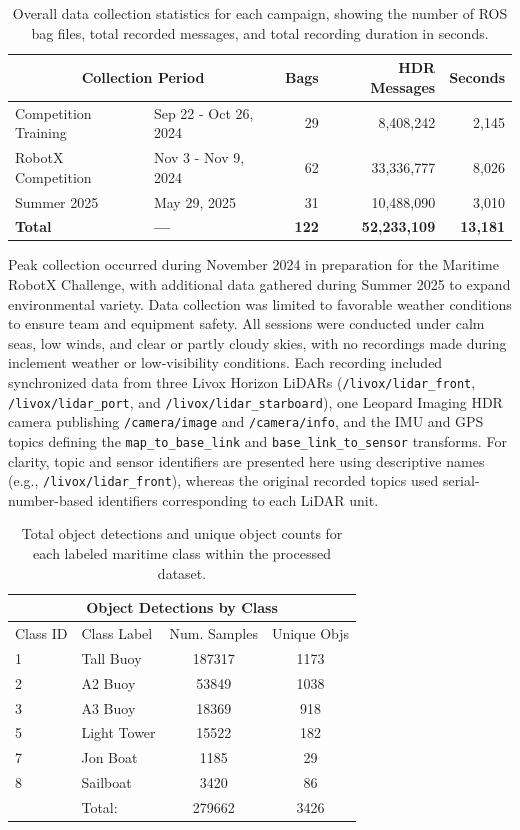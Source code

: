 \documentclass[../main.tex]{subfiles}
\begin{document}
\begin{table}[htbp]
\centering
\begin{tabular}{llrrr}
\hline
\multicolumn{2}{c}{Collection Period} & Bags & HDR Messages & Seconds \\
\hline
\hline
Competition Training & Sep 22 - Oct 26, 2024 & 29 & 8,408,242 & 2,145 \\
RobotX Competition & Nov 3 - Nov 9, 2024 & 62 & 33,336,777 & 8,026 \\
Summer 2025  & May 29, 2025 & 31 & 10,488,090 & 3,010 \\
\hline
\textbf{Total} & \textbf{---} & \textbf{122} & \textbf{52,233,109} & \textbf{13,181} \\
\hline
\end{tabular}
\caption{Overall data collection statistics for each campaign, showing the number of ROS bag files, total recorded messages, and total recording duration in seconds.}
\label{tab:rosbag_stats}
\end{table}

Peak collection occurred during November 2024 in preparation for the Maritime RobotX Challenge, with additional data gathered during Summer 2025 to expand environmental variety.  
Data collection was limited to favorable weather conditions to ensure team and equipment safety. 
All sessions were conducted under calm seas, low winds, and clear or partly cloudy skies, with no recordings made during inclement weather or low-visibility conditions.
Each recording included synchronized data from three Livox Horizon LiDARs  (\texttt{/livox/lidar\_front}, \texttt{/livox/lidar\_port}, and  \texttt{/livox/lidar\_starboard}), one Leopard Imaging HDR camera publishing  \texttt{/camera/image} and \texttt{/camera/info}, and the IMU and GPS topics defining the  \texttt{map\_to\_base\_link} and \texttt{base\_link\_to\_sensor} transforms.
For clarity, topic and sensor identifiers are presented here using descriptive names (e.g., \texttt{/livox/lidar\_front}), whereas the original recorded topics used serial-number-based identifiers corresponding to each LiDAR unit.


\begin{table}[ht]
\centering
\begin{tabular}{llcc}
\hline
\multicolumn{4}{c}{ Object Detections by Class}\\
\hline
\hline
Class ID & Class Label       & Num. Samples & Unique Objs \\
1     & Tall Buoy   & 187317       & 1173         \\
2     & A2 Buoy     & 53849        & 1038         \\
3     & A3 Buoy     & 18369        & 918         \\
5     & Light Tower & 15522        & 182          \\
7     & Jon Boat    & 1185         & 29         \\
8     & Sailboat    & 3420         & 86  \\      
\hline
& Total: & 279662 & 3426
\end{tabular}
\caption{Total object detections and unique object counts for each labeled maritime class within the processed dataset.}
\label{tab:obj_class_dets}
\end{table}
\end{document}
